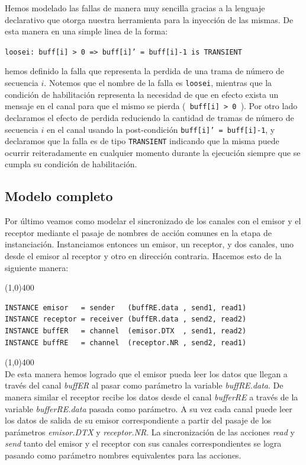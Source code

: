 \documentclass[pdftex,a4paper,12pt]{book}
\newcommand{\textff}[1]{\begin{center}\texttt{#1}\end{center}}
\begin{document}
Hemos modelado las fallas de manera muy sencilla gracias a la lenguaje declarativo que otorga nuestra herramienta para la inyecci\'on de las mismas. De esta manera en una simple linea de la forma: \textff{loosei:~buff[i]~>~0~=>~buff[i]'~=~buff[i]-1~is~TRANSIENT} hemos definido la falla que representa la perdida de una trama de n\'umero de secuencia $i$. Notemos que el nombre de la falla es \texttt{loosei}, mientras que la condici\'on de habilitaci\'on representa la necesidad de que en efecto exista un mensaje en el canal para que el mismo se pierda (\texttt{ buff[i] > 0 }). Por otro lado declaramos el efecto de perdida reduciendo la cantidad de tramas de n\'umero de secuencia $i$ en el canal usando la post-condici\'on \texttt{buff[i]' = buff[i]-1}, y declaramos que la falla es de tipo \texttt{TRANSIENT} indicando que la misma puede ocurrir reiteradamente en cualquier momento durante la ejecuci\'on siempre que se cumpla su condici\'on de habilitaci\'on.

\subsection*{Modelo completo}
Por \'ultimo veamos como modelar el sincronizado de los canales con el emisor y el receptor mediante el pasaje de nombres de acci\'on comunes en la etapa de instanciaci\'on. Instanciamos entonces un emisor, un receptor, y dos canales, uno desde el emisor al receptor y otro en direcci\'on contraria. Hacemos esto de la siguiente manera:

\noindent \line(1,0){400}
\begin{verbatim}
INSTANCE emisor   = sender   (buffRE.data , send1, read1)
INSTANCE receptor = receiver (buffER.data , send2, read2)
INSTANCE buffER   = channel  (emisor.DTX  , send1, read2)
INSTANCE buffRE   = channel  (receptor.NR , send2, read1)
\end{verbatim}
\noindent \line(1,0){400}\\

De esta manera hemos logrado que el emisor pueda leer los datos que llegan a trav\'es del canal \textit{buffER} al pasar como par\'ametro la variable \textit{buffRE.data}. De manera similar el receptor recibe los datos desde el canal \textit{bufferRE} a trav\'es de la variable \textit{bufferRE.data} pasada como par\'ametro. A su vez cada canal puede leer los datos de salida de su emisor correspondiente a partir del pasaje de los par\'ametros \textit{emisor.DTX} y \textit{receptor.NR}. La sincronizaci\'on de las acciones \textit{read} y \textit{send} tanto del emisor y el receptor con sus canales correspondientes se logra pasando como par\'ametro nombres equivalentes para las acciones.
\end{document}
